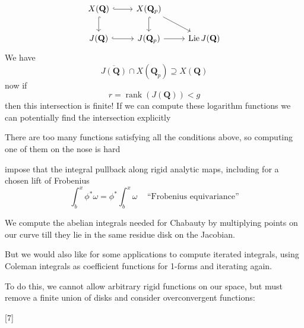 \documentclass[oneside,11pt,]{article}
\let\emph\relax %
\begin{document}
\[\begin{tikzcd}
	{X(\mathbf Q)} & {X(\mathbf Q_p)} \\
    {J(\mathbf Q)} & {J(\mathbf Q_p)} & {\operatorname{Lie} J (\mathbf Q)}
	\arrow[hook, from=1-1, to=1-2]
	\arrow[hook, from=1-1, to=2-1]
	\arrow[hook, from=1-2, to=2-2]
	\arrow[hook, from=2-1, to=2-2]
	\arrow[from=1-2, to=2-3]
	\arrow[from=2-2, to=2-3]
\end{tikzcd}\]
We have
\[\overline {J(\mathbf Q)} \cap X(\mathbf Q_p) \supseteq X(\mathbf Q)\]
now if \[r = \operatorname{rank}(J(\mathbf Q)) < g\] then this intersection is finite!
If we can compute these logarithm functions we can potentially find the intersection explicitly

\emph{Problem:} There are too many functions satisfying all the conditions above, so computing one of them on the nose is hard

\emph{Coleman's idea:} impose that the integral pullback along rigid analytic maps, including for a chosen lift of Frobenius
\[\int_b^x \phi^*\omega = \phi^*\int_b^x \omega\,\quad\text{``Frobenius equivariance''}\]%

We \emph{can} compute the abelian integrals needed for Chabauty by multiplying points on our curve till they lie in the same residue disk on the Jacobian.

But we would also like for some applications to compute iterated integrals, using Coleman integrals as coefficient functions for 1-forms and iterating again.

To do this, we cannot allow arbitrary rigid functions on our space, but must remove a finite union of disks and consider overconvergent functions:

   [7]
\end{document}
